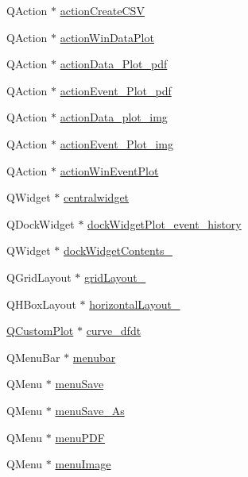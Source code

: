 \begin{DoxyCompactItemize}
\item 
Q\+Action $\ast$ \hyperlink{a00081_ae81b7303db9e9c5d730c59b86ec0e960}{action\+Create\+C\+S\+V}
\item 
Q\+Action $\ast$ \hyperlink{a00081_aa09067a9c96c9cd78f75261a9fcb89f0}{action\+Win\+Data\+Plot}
\item 
Q\+Action $\ast$ \hyperlink{a00081_a19203ba5fef3bc68f3d88f1dd3c94777}{action\+Data\+\_\+\+Plot\+\_\+pdf}
\item 
Q\+Action $\ast$ \hyperlink{a00081_a4369770edbf9cb6131a066ca10b3f863}{action\+Event\+\_\+\+Plot\+\_\+pdf}
\item 
Q\+Action $\ast$ \hyperlink{a00081_ae841c150cf6131bef2e8d12da0401ce2}{action\+Data\+\_\+plot\+\_\+img}
\item 
Q\+Action $\ast$ \hyperlink{a00081_a789f5466c7f1781c13d4d027e982ca55}{action\+Event\+\_\+\+Plot\+\_\+img}
\item 
Q\+Action $\ast$ \hyperlink{a00081_ac72ec9c8679d46fd43a87f99ee6db893}{action\+Win\+Event\+Plot}
\item 
Q\+Widget $\ast$ \hyperlink{a00081_ac9ab4609922159e8e4cc45905f76928e}{centralwidget}
\item 
Q\+Dock\+Widget $\ast$ \hyperlink{a00081_a2a8f7ee8d4458dd20481c8a1c29ce185}{dock\+Widget\+Plot\+\_\+event\+\_\+history}
\item 
Q\+Widget $\ast$ \hyperlink{a00081_a538c2b98d6f228a073dea0a3ddb4350e}{dock\+Widget\+Contents\+\_}
\item 
Q\+Grid\+Layout $\ast$ \hyperlink{a00081_a21cc18536b3c91200eceb2e5e01d3293}{grid\+Layout\+\_}
\item 
Q\+H\+Box\+Layout $\ast$ \hyperlink{a00081_a0a28f44d5179dd3cd2c84f4a1ac581c8}{horizontal\+Layout\+\_}
\item 
\hyperlink{a00030_d8/d00/a00186}{Q\+Custom\+Plot} $\ast$ \hyperlink{a00081_a43d24fa14d90cc27b310542e39dcdd1b}{curve\+\_\+dfdt}
\item 
Q\+Menu\+Bar $\ast$ \hyperlink{a00081_adddc4285028693f10dfd49cd08276e83}{menubar}
\item 
Q\+Menu $\ast$ \hyperlink{a00081_a5ef77bf8c78c201d83049ee8b40cf345}{menu\+Save}
\item 
Q\+Menu $\ast$ \hyperlink{a00081_aaf69c873ec3bf0ea397829122ca4a224}{menu\+Save\+\_\+\+As}
\item 
Q\+Menu $\ast$ \hyperlink{a00081_a4cdb6b113583d4ef43a08b5526c13e3a}{menu\+P\+D\+F}
\item 
Q\+Menu $\ast$ \hyperlink{a00081_af1ff1ecbe6ea007cfeda320cca9865b7}{menu\+Image}

\end{DoxyCompactItemize}
